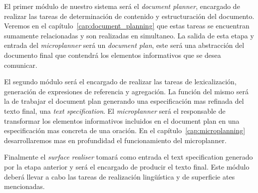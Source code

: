 El primer módulo de nuestro sistema será el \emph{document planner}, encargado de realizar las tareas de determinación de contenido y estructuración del documento. Veremos en el capítulo~\ref{cap:document_planning} que estas tareas se encuentran sumamente relacionadas y son realizadas en simultaneo. La salida de esta etapa y entrada del \emph{microplanner} será un \emph{document plan}, este será una abstracción del documento final que contendrá los elementos informativos que se desea comunicar.

El segundo módulo será el encargado de realizar las tareas de lexicalización, generación de expresiones de referencia y agregación. La función del mismo será la de trabajar el document plan generando una especificación mas refinada del texto final, una \emph{text specification}. El \emph{microplanner} será el responsable de transformar los elementos informativos incluidos en el document plan en una especificación mas concreta de una oración. En el capítulo~\ref{cap:microplanning} desarrollaremos mas en profundidad el funcionamiento del microplanner.

Finalmente el \emph{surface realiser} tomará como entrada el text specification generado por la etapa anterior y será el encargado de producir el texto final. Este módulo deberá llevar a cabo las tareas de realización lingüística y de superficie ates mencionadas.